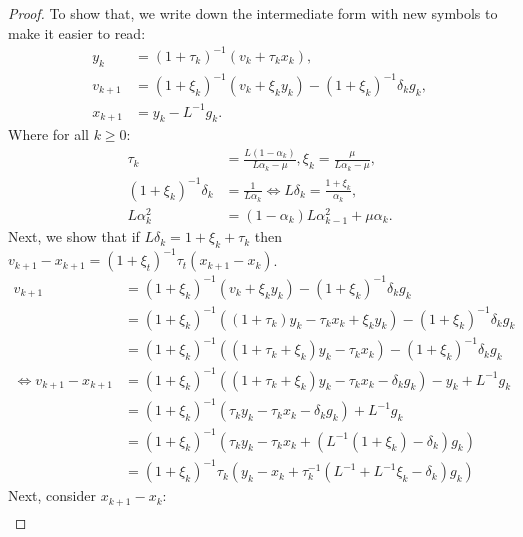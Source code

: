 \documentclass[12pt]{article}
\begin{document}
    \begin{proof}
        To show that, we write down the intermediate form with new symbols to make it easier to read: 
        \begin{align*}
            y_k &= (1 + \tau_k)^{-1}(v_k + \tau_k x_k),
            \\
            v_{k + 1} &= (1 + \xi_k)^{-1}(v_k + \xi_k y_k) - (1 + \xi_k)^{-1}\delta_k g_k,
            \\
            x_{k + 1} &= y_k - L^{-1} g_k. 
        \end{align*} 
        Where for all $k \ge0$: 
        \begin{align*}
            \tau_k &= \frac{L(1 - \alpha_k)}{L\alpha_k - \mu}, 
            \xi_k = \frac{\mu}{L \alpha_k - \mu},
            \\
            (1 + \xi_k)^{-1}\delta_k &= \frac{1}{L\alpha_k}
            \iff L \delta_k = \frac{1 + \xi_k}{\alpha_k}, 
            \\
            L\alpha_k^2 &= (1 - \alpha_k)L\alpha_{k - 1}^2 + \mu\alpha_k. 
        \end{align*}
        Next, we show that if $L\delta_k = 1 + \xi_k + \tau_k$ then $v_{k + 1} - x_{k + 1} = (1 + \xi_t)^{-1}\tau_t(x_{k + 1} - x_k)$. 
        \begin{align*}
            v_{k + 1} &= (1 + \xi_k)^{-1}(v_k + \xi_k y_k) - (1 + \xi_k)^{-1}\delta_k g_k
            \\
            &= 
            (1 + \xi_k)^{-1}((1 + \tau_k)y_k - \tau_k x_k + \xi_k y_k) - (1 + \xi_k)^{-1}\delta_k g_k
            \\
            &= 
            (1 + \xi_k)^{-1}((1 + \tau_k + \xi_k)y_k - \tau_k x_k) - (1 + \xi_k)^{-1}\delta_k g_k
            \\
            \iff 
            v_{k + 1} - x_{k + 1} &= 
            (1 + \xi_k)^{-1}((1 + \tau_k + \xi_k)y_k - \tau_k x_k - \delta_k g_k) - y_k + L^{-1}g_k
            \\
            &= (1 + \xi_k)^{-1}(\tau_k y_k - \tau_k x_k - \delta_k g_k) + L^{-1}g_k
            \\
            &= (1 + \xi_k)^{-1}(\tau_k y_k - \tau_k x_k + (L^{-1}(1 + \xi_k) - \delta_k )g_k)
            \\
            &= (1 + \xi_k)^{-1}\tau_k(y_k - x_k + \tau_k^{-1}(L^{-1} + L^{-1}\xi_k - \delta_k )g_k)
        \end{align*}
        Next, consider $x_{k + 1} - x_{k}$: 
        \begin{align*}

\end{align*}
\end{proof}
\end{document}
